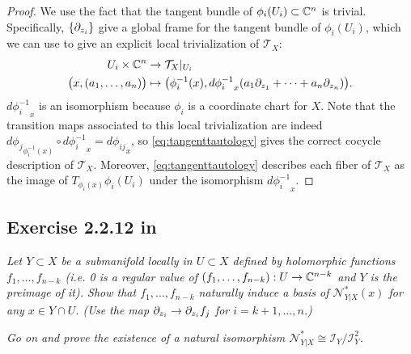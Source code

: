 \documentclass{article}
\begin{document}
\begin{proof}
We use the fact that the tangent bundle of $\phi_i(U_i) \subset \mathbb{C}^n$ is trivial. Specifically, $\{\partial_{z_i}\}$
give a global frame for the tangent bundle of $\phi_i(U_i)$, which we can use to give an explicit local
trivialization of $\mathcal{T}_X$:
\begin{align}
\label{eq:tangenttautology}
\begin{split}
U_i \times \mathbb{C}^n &\to \mathcal{T}_X|_{U_i}  \\
\big(x, (a_1, \dots, a_n)\big) &\mapsto \big(\phi_i^{-1}(x), d{\phi_i^{-1}}_x (a_1 \partial_{z_1} + \dots + a_n 
\partial_{z_n})\big).
\end{split}
\end{align}
$d{\phi_i^{-1}}_x$ is an isomorphism because $\phi_i$ is a coordinate chart for $X$. Note that the transition
maps associated to this local trivialization are indeed $d{\phi_j}_{\phi_i^{-1}(x)} \circ d{\phi_i^{-1}}_x 
= d{\phi_{ij}}_x$, so \ref{eq:tangenttautology} gives the correct cocycle description of $\mathcal{T}_X$.
Moreover, \ref{eq:tangenttautology} describes each fiber of $\mathcal{T}_X$ as the image of $T_{\phi_i(x)}
\phi_i(U_i)$ under the isomorphism $d{\phi_i^{-1}}_x$.
\end{proof}

\subsection*{Exercise 2.2.12 in \cite{Huy}}
\emph{Let $Y \subset X$ be a submanifold locally in $U \subset X$ defined by holomorphic functions
$f_1, \dots, f_{n-k}$ (i.e. 0 is a regular value of $(f_1, \dots, f_{n-k}) : U \to \mathbb{C}^{n-k}$ and $Y$ is the
preimage of it). Show that $f_1, \dots, f_{n-k}$ naturally induce a basis of $\mathcal{N}^*_{Y|X}(x)$ for
any $x \in Y \cap U$. (Use the map $\partial_{z_i} \to \partial_{z_i} f_j$ for $i = k+1, \dots, n$.)}

\emph{Go on and prove the existence of a natural isomorphism $\mathcal{N}^*_{Y|X} \cong 
\mathcal{I}_Y/\mathcal{I}_Y^2$.}
\end{document}
